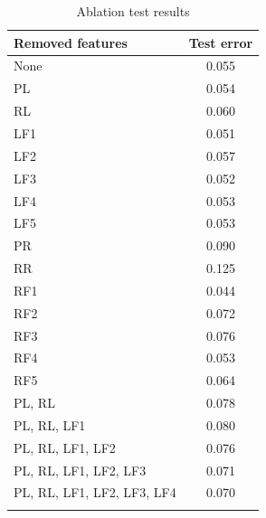 \documentclass[twocolumn]{article}
\begin{document}
\begin{table}[h]
    \centering
    \caption{Ablation test results}
    \label{table:ablation}
    \resizebox{\columnwidth}{!} {
        \begin{tabular}{|l|c|}
        \hline
        Removed features & Test error \\ \hline
        None & 0.055 \\ \arrayrulecolor{gray}\hline\arrayrulecolor{black}
        PL & 0.054 \\ \arrayrulecolor{gray}\hline\arrayrulecolor{black}
        RL & 0.060 \\ \arrayrulecolor{gray}\hline\arrayrulecolor{black}
        LF1 & 0.051 \\ \arrayrulecolor{gray}\hline\arrayrulecolor{black}
        LF2 & 0.057 \\ \arrayrulecolor{gray}\hline\arrayrulecolor{black}
        LF3 & 0.052 \\ \arrayrulecolor{gray}\hline\arrayrulecolor{black}
        LF4 & 0.053 \\ \arrayrulecolor{gray}\hline\arrayrulecolor{black}
        LF5 & 0.053 \\ \arrayrulecolor{gray}\hline\arrayrulecolor{black}
        \rowcolor{lightgray} PR & 0.090 \\ \arrayrulecolor{gray}\hline\arrayrulecolor{black}
        \rowcolor{lightgray} RR & 0.125 \\ \arrayrulecolor{gray}\hline\arrayrulecolor{black}
        RF1 & 0.044 \\ \arrayrulecolor{gray}\hline\arrayrulecolor{black}
        RF2 & 0.072 \\ \arrayrulecolor{gray}\hline\arrayrulecolor{black}
        RF3 & 0.076 \\ \arrayrulecolor{gray}\hline\arrayrulecolor{black}
        RF4 & 0.053 \\ \arrayrulecolor{gray}\hline\arrayrulecolor{black}
        RF5 & 0.064 \\ \arrayrulecolor{gray}\hline\arrayrulecolor{black}
        PL, RL & 0.078 \\ \arrayrulecolor{gray}\hline\arrayrulecolor{black}
        PL, RL, LF1 & 0.080 \\ \arrayrulecolor{gray}\hline\arrayrulecolor{black}
        PL, RL, LF1, LF2 & 0.076 \\ \arrayrulecolor{gray}\hline\arrayrulecolor{black}
        PL, RL, LF1, LF2, LF3 & 0.071 \\ \arrayrulecolor{gray}\hline\arrayrulecolor{black}
        PL, RL, LF1, LF2, LF3, LF4 & 0.070 \\ \arrayrulecolor{gray}\hline\arrayrulecolor{black}

\end{tabular}}
\end{table}
\end{document}
